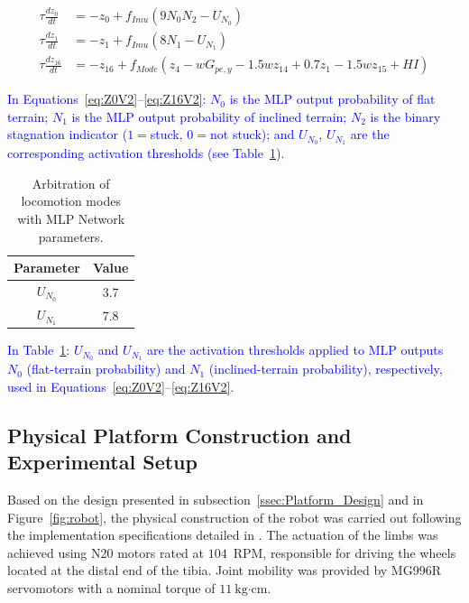 \documentclass[preprint,12pt]{elsarticle}
\newcommand{\revblue}[1]{\textcolor{blue}{#1}}
\begin{document}
\begin{align}
\tau \frac{dz_0}{dt} &= -z_0 + f_{Imu}(9 N_{0} N_{2} - U_{N_{0}})
\label{eq:Z0V2}
\\
\tau \frac{dz_1}{dt} &= -z_1 +  f_{Imu}(8 N_{1} - U_{N_{1}})
\\
\tau \frac{dz_{16}}{dt} &= -z_{16} +  f_{Mode}( z_4 - wG_{pe,y} - 1.5wz_{14}  + 0.7z_1 - 1.5wz_{15} + HI)
\label{eq:Z16V2}
\end{align}

\revblue{In Equations~\eqref{eq:Z0V2}–\eqref{eq:Z16V2}: $N_0$ is the MLP output probability of flat terrain; $N_1$ is the MLP output probability of inclined terrain; $N_2$ is the binary stagnation indicator ($1 ={}$stuck, $0 ={}$not stuck); and $U_{N_0}$, $U_{N_1}$ are the corresponding activation thresholds (see Table~\ref{table:Locom_MLP}).}

\begin{table}%
\centering
\caption{Arbitration of locomotion modes with MLP Network parameters.}
\begin{tabular}{|c|c|}
\hline
\textbf{Parameter} & \textbf{Value} \\ \hline

$U_{N_{0}}$ & 3.7 \\ \hline
$U_{N_{1}}$ & 7.8 \\ \hline

\end{tabular}
\label{table:Locom_MLP}
\end{table}

\revblue{In Table~\ref{table:Locom_MLP}: $U_{N_0}$ and $U_{N_1}$ are the activation thresholds applied to MLP outputs $N_0$ (flat-terrain probability) and $N_1$ (inclined-terrain probability), respectively, used in Equations~\eqref{eq:Z0V2}--\eqref{eq:Z16V2}.}

\subsection{Physical Platform Construction and Experimental Setup}
\label{ssec:Construction}

Based on the design presented in subsection~\ref{ssec:Platform_Design} and in Figure~\ref{fig:robot}, the physical construction of the robot was carried out following the implementation specifications detailed in \citep{Grajales_Des_2025}. The actuation of the limbs was achieved using N20 motors rated at $104$~RPM, responsible for driving the wheels located at the distal end of the tibia. Joint mobility was provided by MG996R servomotors with a nominal torque of $11~\text{kg·cm}$. 
\end{document}
